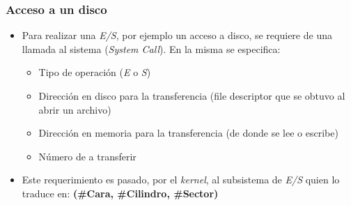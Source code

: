 \begin{frame}
  \frametitle{Acceso a un disco}
  \begin{itemize}
  	\item Para realizar una \emph{E/S}, por ejemplo un acceso a disco, se requiere de una llamada al sistema (\textit{System Call}). En la misma se especifica:
  	\begin{itemize}
  		\item Tipo de operación (\emph{E} o \emph{S})
  		\item Dirección en disco para la transferencia (file descriptor que se obtuvo al abrir un archivo)
  		\item Dirección en memoria para la transferencia (de donde se lee o escribe)
  		\item Número de \bytes a transferir
  	\end{itemize}
  	\item Este requerimiento es pasado, por el \textit{kernel}, al subsistema de \emph{E/S} quien lo traduce en: \textbf{(\#Cara, \#Cilindro, \#Sector)}
  \end{itemize}
\end{frame}


